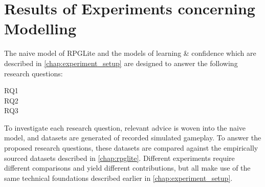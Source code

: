 \chapter{Results of Experiments concerning \AspectOriented Modelling}
\label{chap:exp2_old_aspects_new_systems}
\label{chap:experimental_results}
\label{sec:optimisation_with_aspects_experimental_results}



The naive model of RPGLite and the \aspectoriented models of learning \&
confidence which are described in \cref{chap:experiment_setup} are designed to
answer the following research questions:

\begin{researchquestion}
  \begin{description}
\item[RQ1] \rqone{}
\item[RQ2] \rqtwo{}
\item[RQ3] \rqthree{}
  \end{description}
\end{researchquestion}


To investigate each research question, relevant advice is woven into the naive
model, and datasets are generated of recorded simulated gameplay. To answer the
proposed research questions, these datasets are compared against the empirically
sourced datasets described in \cref{chap:rpglite}. Different experiments require
different comparisons and yield different contributions, but all make use of the
same technical foundations described earlier in \cref{chap:experiment_setup}.

